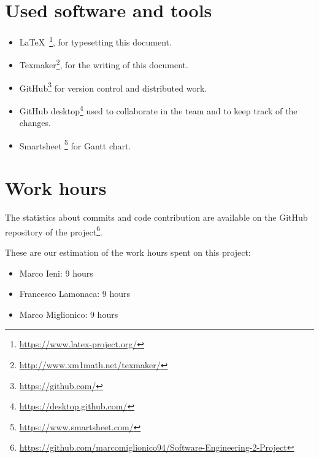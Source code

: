 \section{Used software and tools}
\begin{itemize}
    \item \LaTeX\ \footnote{\url{https://www.latex-project.org/}}, for typesetting this document.
    \item Texmaker\footnote{\url{http://www.xm1math.net/texmaker/}}, for the writing of this document.
    \item GitHub\footnote{\url{https://github.com/}} for version control and distributed work.
   \item GitHub desktop\footnote{\url{https://desktop.github.com/}} used to collaborate in the team and to keep track of the changes. 
    \item Smartsheet \footnote{\url{https://www.smartsheet.com/}} for Gantt chart. 
\end{itemize}

\section{Work hours}
The statistics about commits and code contribution are available on the GitHub repository of the project\footnote{\url{https://github.com/marcomiglionico94/Software-Engineering-2-Project}}.

These are our estimation of the work hours spent on this project:
\begin{itemize}
    \item Marco Ieni: 9 hours
    \item Francesco Lamonaca: 9 hours
    \item Marco Miglionico: 9 hours
\end{itemize}

